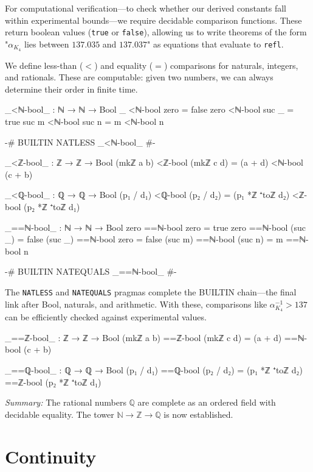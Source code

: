 \documentclass[11pt,a4paper]{book}
\begin{document}
For computational verification—to check whether our derived constants fall within experimental 
bounds—we require decidable comparison functions. These return boolean values (\texttt{true} 
or \texttt{false}), allowing us to write theorems of the form "$\alpha_{K_4}$ lies between 
$137.035$ and $137.037$" as equations that evaluate to \texttt{refl}.

We define less-than ($<$) and equality ($=$) comparisons for naturals, integers, and rationals. 
These are computable: given two numbers, we can always determine their order in finite time.

\begin{code}
_<ℕ-bool_ : ℕ → ℕ → Bool
_ <ℕ-bool zero = false
zero <ℕ-bool suc _ = true
suc m <ℕ-bool suc n = m <ℕ-bool n

{-# BUILTIN NATLESS _<ℕ-bool_ #-}

_<ℤ-bool_ : ℤ → ℤ → Bool
(mkℤ a b) <ℤ-bool (mkℤ c d) = (a + d) <ℕ-bool (c + b)

_<ℚ-bool_ : ℚ → ℚ → Bool
(p₁ / d₁) <ℚ-bool (p₂ / d₂) = 
  (p₁ *ℤ ⁺toℤ d₂) <ℤ-bool (p₂ *ℤ ⁺toℤ d₁)

_==ℕ-bool_ : ℕ → ℕ → Bool
zero ==ℕ-bool zero = true
zero ==ℕ-bool (suc _) = false
(suc _) ==ℕ-bool zero = false
(suc m) ==ℕ-bool (suc n) = m ==ℕ-bool n

{-# BUILTIN NATEQUALS _==ℕ-bool_ #-}
\end{code}

The \texttt{NATLESS} and \texttt{NATEQUALS} pragmas complete the BUILTIN chain—the final 
link after Bool, naturals, and arithmetic. With these, comparisons like $\alpha_{K_4}^{-1} > 137$ 
can be efficiently checked against experimental values.

\begin{code}
_==ℤ-bool_ : ℤ → ℤ → Bool
(mkℤ a b) ==ℤ-bool (mkℤ c d) = (a + d) ==ℕ-bool (c + b)

_==ℚ-bool_ : ℚ → ℚ → Bool
(p₁ / d₁) ==ℚ-bool (p₂ / d₂) = 
  (p₁ *ℤ ⁺toℤ d₂) ==ℤ-bool (p₂ *ℤ ⁺toℤ d₁)
\end{code}

\medskip
\noindent\textit{Summary:} The rational numbers $\mathbb{Q}$ are complete as an ordered field 
with decidable equality. The tower $\mathbb{N} \to \mathbb{Z} \to \mathbb{Q}$ is now established.

\chapter{Continuity}
\end{document}

